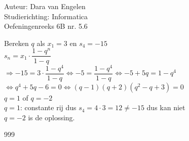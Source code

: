 \documentclass[a4paper]{article}
\begin{document}
	
\noindent \large Auteur: Dara van Engelen     \\
\noindent \large Studierichting: Informatica \\
\noindent \large Oefeningenreeks 6B nr. 5.6 \\
	
\medskip
	
\normalsize

Bereken $q$ als $x_1 = 3$ en $s_4 = -15$\\

$s_n = x_1 \cdot \dfrac{1-q^n}{1-q}$\\

$\Rightarrow -15 = 3 \cdot \dfrac{1-q^4}{1-q} \Leftrightarrow -5 = \dfrac{1-q^4}{1-q} \Leftrightarrow -5 + 5q = 1 - q^4$\\

$\Leftrightarrow q^4 + 5q -6 = 0 \Leftrightarrow (q-1)(q+2)(q^2-q+3) = 0$\\

$q = 1$ of $ q = -2$\\

$ q = 1$: constante rij dus $s_4 = 4\cdot3 = 12 \neq -15$ dus kan niet\\

$ q = -2$ is de oplossing.


\begin{thebibliography}{999}
\end{thebibliography}
\end{document}
